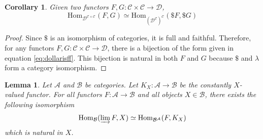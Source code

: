 \documentclass{msthesis}
\newtheorem{lemma}[theorem]{Lemma}
\newtheorem{corollary}[theorem]{Corollary}
\theoremstyle{definition}
\newcommand{\mcB}{\mathcal{B}}
\newcommand{\mcA}{\mathcal{A}}
\newcommand{\mcC}{\mathcal{C}}
\newcommand{\mcD}{\mathcal{D}}
\newcommand{\colim}{\varinjlim}
\newcommand{\Hom}{\mathrm{Hom}}
\begin{document}
\begin{corollary}\label{cor:curry_cat_iso}
    Given two functors $F, G : \mcC \times \mcC \to \mcD$, 
    \begin{equation}\label{eq:dollarisff}
        \Hom_{\mcD^{\mcC \times \mcC}}(F, G) \simeq \Hom_{(\mcD^{\mcC})^\mcC}(\$F, \$G)
    \end{equation}
\end{corollary}

\begin{proof}
    Since $\$$ is an isomorphism of categories, it is full and faithful.  Therefore, for any functors $F, G : \mcC \times \mcC \to \mcD$, there is a bijection of the form given in equation \eqref{eq:dollarisff}.  This bijection is natural in both $F$ and $G$ because $\$$ and $\lambda$ form a category isomorphism.
\end{proof}

\begin{lemma}\label{lemma:cocone_as_nat_trans}
    Let $\mcA$ and $\mcB$ be categories.  Let $K_X : \mcA \to \mcB$ be the constantly $X$-valued functor.  For all functors $F : \mcA \to \mcB$ and all objects $X \in \mcB$, there exists the following isomorphism
    \[ \Hom_{\mcB}(\colim F, X) \simeq \Hom_{\mcB^\mcA}(F, K_X)\]
    which is natural in $X$.
\end{lemma}
\end{document}
